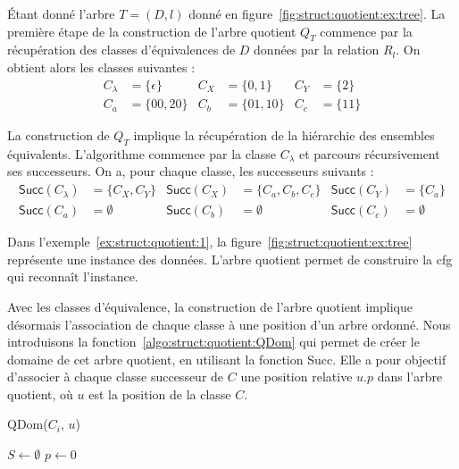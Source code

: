 \begin{example}
    \label{ex:struct:quotient:1}
    Étant donné l'arbre $T = (D, l)$ donné en figure~\ref{fig:struct:quotient:ex:tree}.
    La première étape de la construction de l'arbre quotient $Q_T$ commence par la récupération des classes d'équivalences de $D$ données par la relation $R_l$.
    On obtient alors les classes suivantes :
    \begin{align*}
        C_\lambda & = \{\epsilon\} & C_X & = \{0, 1\}   & C_Y & = \{2\}  \\
        C_a       & = \{00, 20\}   & C_b & = \{01, 10\} & C_c & = \{11\}
    \end{align*}

    La construction de $Q_T$ implique la récupération de la hiérarchie des ensembles équivalents.
    L'algorithme commence par la classe $C_\lambda$ et parcours récursivement ses successeurs.
    On a, pour chaque classe, les successeurs suivants :
    \begin{align*}
        \textsf{Succ}(C_\lambda) & = \{C_X, C_Y\} & \textsf{Succ}(C_X) & = \{C_a, C_b, C_c\} & \textsf{Succ}(C_Y) & = \{C_a\}   \\
        \textsf{Succ}(C_a)       & = \emptyset    & \textsf{Succ}(C_b) & = \emptyset         & \textsf{Succ}(C_c) & = \emptyset
    \end{align*}
\end{example}

Dans l'exemple~\ref{ex:struct:quotient:1}, la figure~\ref{fig:struct:quotient:ex:tree} représente une instance des données.
L'arbre quotient permet de construire la \gls{cfg} qui reconnaît l'instance.

Avec les classes d'équivalence, la construction de l'arbre quotient implique désormais l'association de chaque classe à une position d'un arbre ordonné.
Nous introduisons la fonction~\ref{algo:struct:quotient:QDom} qui permet de créer le domaine de cet arbre quotient, en utilisant la fonction \textsf{Succ}.
Elle a pour objectif d'associer à chaque classe successeur de $C$ une position relative $u.p$ dans l'arbre quotient, où $u$ est la position de la classe $C$.

\begin{function}[htb]
    \caption{QDom($C_i$, $u$)}
    \label{algo:struct:quotient:QDom}

    $S \gets \emptyset$\;
    $p \gets 0$\;
\end{function}

